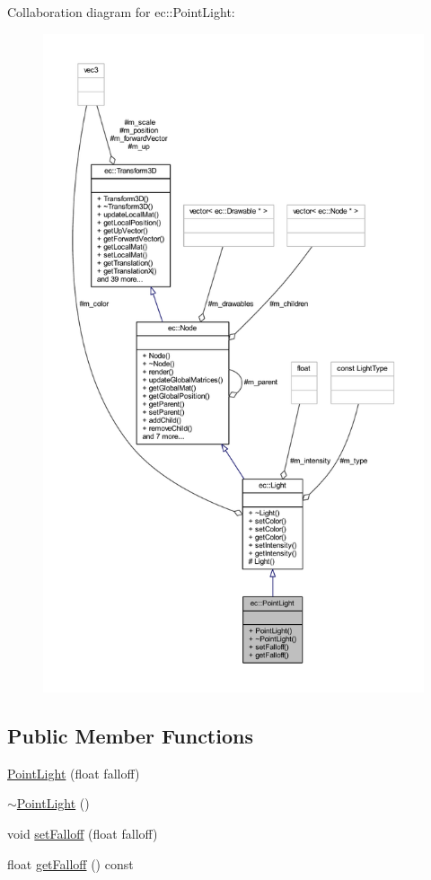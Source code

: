 Collaboration diagram for ec\+:\+:Point\+Light\+:\nopagebreak
\begin{figure}[H]
\begin{center}
\leavevmode
\includegraphics[height=550pt]{classec_1_1_point_light__coll__graph}
\end{center}
\end{figure}
\subsection*{Public Member Functions}
\begin{DoxyCompactItemize}
\item 
\mbox{\hyperlink{classec_1_1_point_light_a0c923024a80bc54416d7b4fe30831546}{Point\+Light}} (float falloff)
\item 
\mbox{\hyperlink{classec_1_1_point_light_aef9daa8a54baa73d1dfc724100cfbf38}{$\sim$\+Point\+Light}} ()
\item 
void \mbox{\hyperlink{classec_1_1_point_light_a64949f08f93b178b110f9c366d72ce89}{set\+Falloff}} (float falloff)
\item 
float \mbox{\hyperlink{classec_1_1_point_light_a916752aad9fa46fc86c8df3fe1f796cb}{get\+Falloff}} () const
\end{DoxyCompactItemize}
